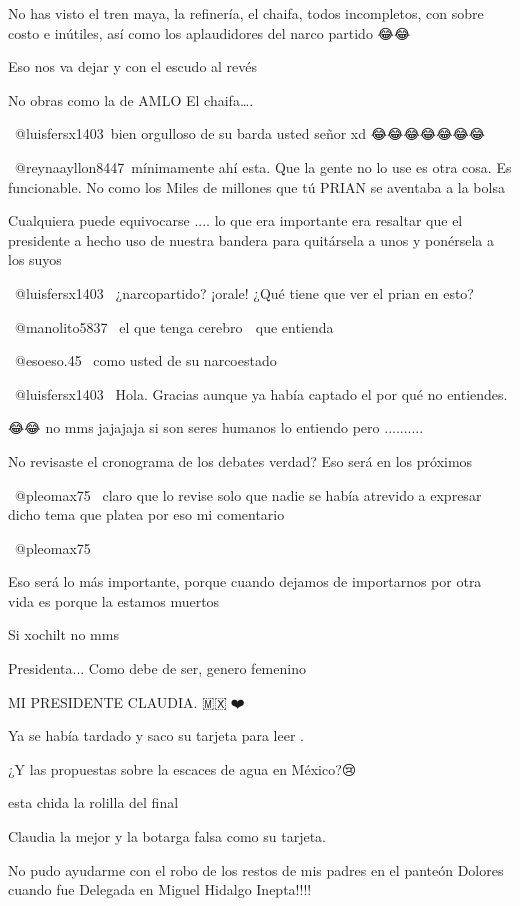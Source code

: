 No has visto el tren maya, la refinería, el chaifa, todos incompletos, con sobre costo e inútiles, así como los aplaudidores del narco partido 😂😂

Eso nos va dejar y con el escudo al revés

No obras como la de AMLO 
El chaifa….

​ @luisfersx1403 bien orgulloso de su barda usted señor xd 😂😂😂😂😂😂😂

​ @reynaayllon8447 mínimamente ahí esta. Que la gente no lo use es otra cosa. Es funcionable. No como los Miles de millones que tú PRIAN se aventaba a la bolsa

Cualquiera puede equivocarse .... lo  que  era importante era resaltar que el presidente  a hecho uso de nuestra bandera  para quitársela a unos y ponérsela a los suyos

​ @luisfersx1403   ¿narcopartido?  ¡orale! ¿Qué tiene que ver el prian en esto?

 @manolito5837  el que tenga cerebro 🧠 que entienda 🤗

 @esoeso.45  como usted de su narcoestado 🤗🤗

 @luisfersx1403    Hola.    Gracias  aunque ya había captado el por qué no entiendes.

😂😂 no mms jajajaja si son seres humanos lo entiendo pero ..........

No revisaste el cronograma de los debates verdad? Eso será en los próximos

 @pleomax75  claro que lo revise solo que nadie se había atrevido a expresar dicho tema que platea por eso mi comentario

 @pleomax75  

Eso será lo más importante, porque cuando dejamos de importarnos por otra vida es porque la estamos muertos

Si xochilt no mms

Presidenta... Como debe de ser, genero femenino

MI PRESIDENTE CLAUDIA. 🇲🇽🌹❤️

Ya se había tardado y saco su tarjeta para leer .

¿Y las propuestas sobre la escaces de agua en México?😢

esta chida la rolilla del final

Claudia la mejor y la botarga falsa como su tarjeta.

No pudo ayudarme con el robo de los restos de mis padres en el panteón Dolores cuando fue Delegada en Miguel Hidalgo 
Inepta!!!!

